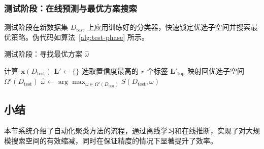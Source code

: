 \documentclass[8pt]{article} %
\numberwithin{equation}{section}
\begin{document}
\subsubsection{测试阶段：在线预测与最优方案搜索}
测试阶段在新数据集 \(D_{\text{test}}\) 上应用训练好的分类器，快速锁定优选子空间并搜索最优策略。伪代码如算法~\ref{alg:test-phase} 所示。

\begin{algorithm}[ht]
\caption{测试阶段：寻找最优方案 \(\hat{\omega}\)}
\label{alg:test-phase}

计算 $\mathbf{x}(D_{\text{test}})$\;
$\mathbf{L}' \leftarrow \{\}$\;
选取置信度最高的 $r$ 个标签 $\mathbf{L}'_{\mathrm{top}}$\;
映射回优选子空间 $\Omega'(D_{\text{test}})$\;
$\hat{\omega} \leftarrow \arg\max_{\omega \in \Omega'(D_{\text{test}})}S(D_{\text{test}}, \omega)$\;
\KwRet{$\hat{\omega}$}
\end{algorithm}

\subsection{小结}
本节系统介绍了自动化聚类方法的流程，通过离线学习和在线推断，实现了对大规模搜索空间的有效缩减，同时在保证精度的情况下显著提升了效率。



\end{document}
